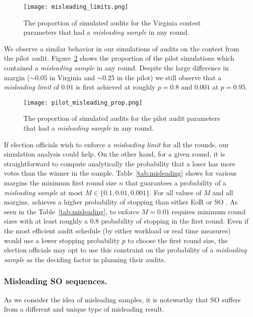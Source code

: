 \begin{figure}
\texttt{[image: misleading\_limits.png]}
\caption{The proportion of simulated \Providence audits for the Virginia contest parameters that had a \emph{misleading sample} in any round.}
\label{fig:misleading}
\end{figure}

We observe a similar behavior in our simulations of audits on the contest from the pilot audit. Figure~\ref{fig:pilot_misleading} shows the proportion of the pilot simulations which contained a \emph{misleading sample} in any round. Despite the large difference in margin ($\sim 0.05$ in Virginia and $\sim 0.25$ in the pilot) we still observe that a \emph{misleading limit} of $0.01$ is first achieved at roughly $p=0.8$ and $0.001$ at $p=0.95$.

\begin{figure}
\texttt{[image: pilot\_misleading\_prop.png]}
\caption{The proportion of simulated \Providence audits for the pilot audit parameters that had a \emph{misleading sample} in any round.}
\label{fig:pilot_misleading}
\end{figure}

If election officials wish to enforce a \emph{misleading limit} for all the rounds, our simulation analysis could help. On the other hand, for a given round, it is straightforward to compute analytically the probability that a loser has more votes than the winner in the sample. Table~\ref{tab:misleading} shows for various margins the minimum first round size $n$ that guarantees a probability of a \emph{misleading sample} at most $M\in\{0.1,0.01,0.001\}$. For all values of $M$ and all margins, \Providence achieves a higher probability of stopping than either EoR \BRAVO or SO \BRAVO. 
    As seen in the Table~\ref{tab:misleading}, to enforce $M=0.01$ requires minimum round sizes with at least roughly a $0.8$ probability of stopping in the first round. Even if the most efficient audit schedule (by either workload or real time measures) would use a lower stopping probability $p$ to choose the first round size, the election officials may opt to use this constraint on the probability of a \emph{misleading sample} as the deciding factor in planning their audits.

\subsubsection{Misleading SO \BRAVO sequences.} As we consider the idea of misleading samples, it is noteworthy that SO \BRAVO suffers from a different and unique type of misleading result. 

